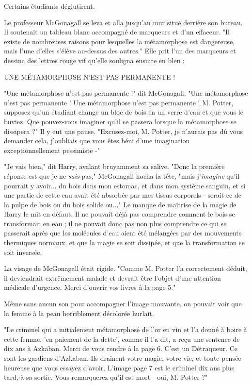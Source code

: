 Certains étudiants déglutirent.

Le professeur McGonagall se leva et alla jusqu'au mur situé derrière son bureau. Il soutenait un tableau blanc accompagné de marqueurs et d'un effaceur. "Il existe de nombreuses raisons pour lesquelles la métamorphose est dangereuse, mais l'une d'elles s'élève au-dessus des autres." Elle prit l'un des marqueurs et dessina des lettres rouge vif qu'elle souligna ensuite en bleu :


\begin{center}\MakeUppercase{UNE MÉTAMORPHOSE N'EST PAS PERMANENTE !}\end{center}


"Une métamorphose n'est pas permanente !" dit McGonagall. "Une métamorphose n'est pas permanente ! Une métamorphose n'est pas permanente ! M. Potter, supposez qu'un étudiant change un bloc de bois en un verre d'eau et que vous le buviez. Que pouvez-vous imaginer qu'il se passera lorsque la métamorphose se dissipera ?" Il y eut une pause. "Excusez-moi, M. Potter, je n'aurais pas dû vous demander cela, j'oubliais que vous êtes béni d'une imagination exceptionnellement pessimiste -"

"Je vais bien," dit Harry, avalant bruyamment sa salive. "Donc la première réponse est que je ne \emph{sais}  pas," McGonagall hocha la tête, "mais j'\emph{imagine}  qu'il pourrait y avoir... du bois dans mon estomac, et dans mon système sanguin, et si une partie de cette eau avait été absorbée par mes tissus corporels - serait-ce de la pulpe de bois ou du bois solide ou..." Le manque de maîtrise de la magie de Harry le mit en défaut. Il ne pouvait déjà pas comprendre comment le bois se transformait en eau ; il ne pouvait donc pas non plus comprendre ce qui se passerait après que les molécules d'eau aient été mélangées par des mouvements thermiques normaux, et que la magie se soit dissipée, et que la transformation se soit inversée.

La visage de McGonagall était rigide. "Comme M. Potter l'a correctement déduit, il deviendrait extrêmement malade et devrait être l'objet d'une attention médicale d'urgence. Merci d'ouvrir vos livres à la page 5."

Même sans aucun son pour accompagner l'image mouvante, on pouvait voir que la femme à la peau horriblement décolorée hurlait.

"Le criminel qui a initialement métamorphosé de l'or en vin et l'a donné à boire à cette femme, 'en paiement de la dette', comme il l'a dit, a reçu une sentence de dix ans à Azkaban. Merci de vous rendre à la page 6. C'est un Détraqueur. Ce sont les gardiens d'Azkaban. Ils drainent votre magie, votre vie, et toute pensée heureuse que vous essayez d'avoir. L'image page 7 est le criminel dix ans plus tard, à sa sortie. Vous remarquerez qu'il est mort - oui, M. Potter ?"


